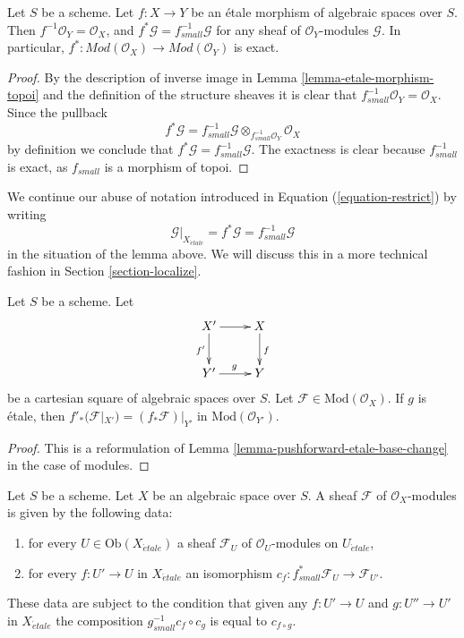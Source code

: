 \begin{lemma}
\label{lemma-etale-exact-pullback}
Let $S$ be a scheme.
Let $f : X \to Y$ be an \'etale morphism of algebraic spaces over $S$.
Then $f^{-1}\mathcal{O}_Y = \mathcal{O}_X$, and
$f^*\mathcal{G} = f_{small}^{-1}\mathcal{G}$ for any sheaf of
$\mathcal{O}_Y$-modules $\mathcal{G}$. In particular,
$f^* : \textit{Mod}(\mathcal{O}_X) \to \textit{Mod}(\mathcal{O}_Y)$
is exact.
\end{lemma}

\begin{proof}
By the description of inverse image in Lemma \ref{lemma-etale-morphism-topoi}
and the definition of the structure sheaves it is clear that
$f_{small}^{-1}\mathcal{O}_Y = \mathcal{O}_X$. Since the pullback
$$
f^*\mathcal{G} =
f_{small}^{-1}\mathcal{G} \otimes_{f_{small}^{-1}\mathcal{O}_Y}
\mathcal{O}_X
$$
by definition we conclude that $f^*\mathcal{G} = f_{small}^{-1}\mathcal{G}$.
The exactness is clear because $f_{small}^{-1}$ is exact, as $f_{small}$
is a morphism of topoi.
\end{proof}

\noindent
We continue our abuse of notation introduced in
Equation (\ref{equation-restrict})
by writing
\begin{equation}
\label{equation-restrict-modules}
\mathcal{G}|_{X_{\acute{e}tale}}
= f^*\mathcal{G}
= f_{small}^{-1}\mathcal{G}
\end{equation}
in the situation of the lemma above. We will discuss this in a more
technical fashion in
Section \ref{section-localize}.

\begin{lemma}
\label{lemma-pushforward-etale-base-change-modules}
Let $S$ be a scheme. Let
$$
\xymatrix{
X' \ar[r] \ar[d]_{f'} & X \ar[d]^f \\
Y' \ar[r]^g & Y
}
$$
be a cartesian square of algebraic spaces over $S$. Let
$\mathcal{F} \in \text{Mod}(\mathcal{O}_X)$. If $g$ is \'etale, then
$f'_*(\mathcal{F}|_{X'}) = (f_*\mathcal{F})|_{Y'}$ in
$\text{Mod}(\mathcal{O}_{Y'})$.
\end{lemma}

\begin{proof}
This is a reformulation of
Lemma \ref{lemma-pushforward-etale-base-change}
in the case of modules.
\end{proof}

\begin{lemma}
\label{lemma-characterize-module-small-etale}
Let $S$ be a scheme. Let $X$ be an algebraic space over $S$.
A sheaf $\mathcal{F}$ of $\mathcal{O}_X$-modules is given by the following
data:
\begin{enumerate}
\item for every $U \in \text{Ob}(X_{\acute{e}tale})$ a sheaf
$\mathcal{F}_U$ of $\mathcal{O}_U$-modules on $U_{\acute{e}tale}$,
\item for every $f : U' \to U$ in $X_{\acute{e}tale}$ an isomorphism
$c_f : f_{small}^*\mathcal{F}_U \to \mathcal{F}_{U'}$.
\end{enumerate}
These data are subject to the condition that given any $f : U' \to U$
and $g : U'' \to U'$ in $X_{\acute{e}tale}$ the composition
$g_{small}^{-1}c_f \circ c_g$ is equal to $c_{f \circ g}$.
\end{lemma}

